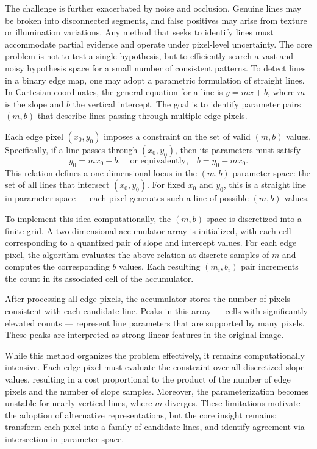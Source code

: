The challenge is further exacerbated by noise and occlusion. Genuine lines may be broken into disconnected segments, and false positives may arise from texture or illumination variations. Any method that seeks to identify lines must accommodate partial evidence and operate under pixel-level uncertainty. The core problem is not to test a single hypothesis, but to efficiently search a vast and noisy hypothesis space for a small number of consistent patterns.
To detect lines in a binary edge map, one may adopt a parametric formulation of straight lines. In Cartesian coordinates, the general equation for a line is $y = mx + b$, where $m$ is the slope and $b$ the vertical intercept. The goal is to identify parameter pairs $(m, b)$ that describe lines passing through multiple edge pixels.

Each edge pixel $(x_0, y_0)$ imposes a constraint on the set of valid $(m, b)$ values. Specifically, if a line passes through $(x_0, y_0)$, then its parameters must satisfy
\[
y_0 = m x_0 + b,
\quad \text{or equivalently,} \quad
b = y_0 - m x_0.
\]
This relation defines a one-dimensional locus in the $(m, b)$ parameter space: the set of all lines that intersect $(x_0, y_0)$. For fixed $x_0$ and $y_0$, this is a straight line in parameter space — each pixel generates such a line of possible $(m, b)$ values.

To implement this idea computationally, the $(m, b)$ space is discretized into a finite grid. A two-dimensional accumulator array is initialized, with each cell corresponding to a quantized pair of slope and intercept values. For each edge pixel, the algorithm evaluates the above relation at discrete samples of $m$ and computes the corresponding $b$ values. Each resulting $(m_i, b_i)$ pair increments the count in its associated cell of the accumulator.

After processing all edge pixels, the accumulator stores the number of pixels consistent with each candidate line. Peaks in this array — cells with significantly elevated counts — represent line parameters that are supported by many pixels. These peaks are interpreted as strong linear features in the original image.

While this method organizes the problem effectively, it remains computationally intensive. Each edge pixel must evaluate the constraint over all discretized slope values, resulting in a cost proportional to the product of the number of edge pixels and the number of slope samples. Moreover, the parameterization becomes unstable for nearly vertical lines, where $m$ diverges. These limitations motivate the adoption of alternative representations, but the core insight remains: transform each pixel into a family of candidate lines, and identify agreement via intersection in parameter space.

